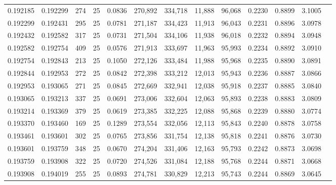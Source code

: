 \begin{tabular}{rrrrrrrrrrrrr}
0.192185 & 0.192299 &   274 &  25 &                                     0.0836 & 270,892 & 334,718 &  11,888 &  96,068 & 0.2230 & 0.8899 & 3.1005 \\
0.192299 & 0.192431 &   295 &  25 &                                     0.0781 & 271,187 & 334,423 &  11,913 &  96,043 & 0.2231 & 0.8896 & 3.0978 \\
0.192432 & 0.192582 &   317 &  25 &                                     0.0731 & 271,504 & 334,106 &  11,938 &  96,018 & 0.2232 & 0.8894 & 3.0948 \\
0.192582 & 0.192754 &   409 &  25 &                                     0.0576 & 271,913 & 333,697 &  11,963 &  95,993 & 0.2234 & 0.8892 & 3.0910 \\
0.192754 & 0.192843 &   213 &  25 &                                     0.1050 & 272,126 & 333,484 &  11,988 &  95,968 & 0.2235 & 0.8890 & 3.0891 \\
0.192844 & 0.192953 &   272 &  25 &                                     0.0842 & 272,398 & 333,212 &  12,013 &  95,943 & 0.2236 & 0.8887 & 3.0866 \\
0.192953 & 0.193065 &   271 &  25 &                                     0.0845 & 272,669 & 332,941 &  12,038 &  95,918 & 0.2237 & 0.8885 & 3.0840 \\
0.193065 & 0.193213 &   337 &  25 &                                     0.0691 & 273,006 & 332,604 &  12,063 &  95,893 & 0.2238 & 0.8883 & 3.0809 \\
0.193214 & 0.193369 &   379 &  25 &                                     0.0619 & 273,385 & 332,225 &  12,088 &  95,868 & 0.2239 & 0.8880 & 3.0774 \\
0.193370 & 0.193460 &   169 &  25 &                                     0.1289 & 273,554 & 332,056 &  12,113 &  95,843 & 0.2240 & 0.8878 & 3.0758 \\
0.193461 & 0.193601 &   302 &  25 &                                     0.0765 & 273,856 & 331,754 &  12,138 &  95,818 & 0.2241 & 0.8876 & 3.0730 \\
0.193601 & 0.193759 &   348 &  25 &                                     0.0670 & 274,204 & 331,406 &  12,163 &  95,793 & 0.2242 & 0.8873 & 3.0698 \\
0.193759 & 0.193908 &   322 &  25 &                                     0.0720 & 274,526 & 331,084 &  12,188 &  95,768 & 0.2244 & 0.8871 & 3.0668 \\
0.193908 & 0.194019 &   255 &  25 &                                     0.0893 & 274,781 & 330,829 &  12,213 &  95,743 & 0.2244 & 0.8869 & 3.0645 \\

\end{tabular}
